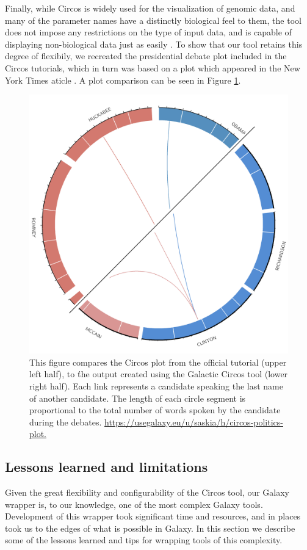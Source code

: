 Finally, while Circos is widely used for the visualization of genomic data, and many of the parameter names have a distinctly biological feel to them, the tool does not impose any restrictions on the type of input data, and is capable of displaying non-biological data just as easily \cite{circosnongenomic}. To show that our tool retains this degree of flexibily, we recreated the presidential debate plot included in the Circos tutorials, which in turn was based on a plot which appeared in the New York Times aticle \cite{namingnames}. A plot comparison can be seen in Figure \ref{figure:debate}.

\begin{figure}[h!]
\centering
\includegraphics[width=0.6\linewidth]{chapters/images/circos/plot-politics-both.png}
\caption{This figure compares the Circos plot from the official tutorial (upper left half), to ťhe output created using the Galactic Circos tool (lower right half). Each link represents a candidate speaking the last name of another candidate. The length of each circle segment is proportional to the total number of words spoken by the candidate during the debates. \url{ https://usegalaxy.eu/u/saskia/h/circos-politics-plot.}}
\label{figure:debate}
\end{figure}


\subsection*{Lessons learned and limitations}

Given the great flexibility and configurability of the Circos tool, our Galaxy wrapper is, to our knowledge, one of the most complex Galaxy tools. Development of this wrapper took significant time and resources, and in places took us to the edges of what is possible in Galaxy. In this section we describe some of the lessons learned and tips for wrapping tools of this complexity.

